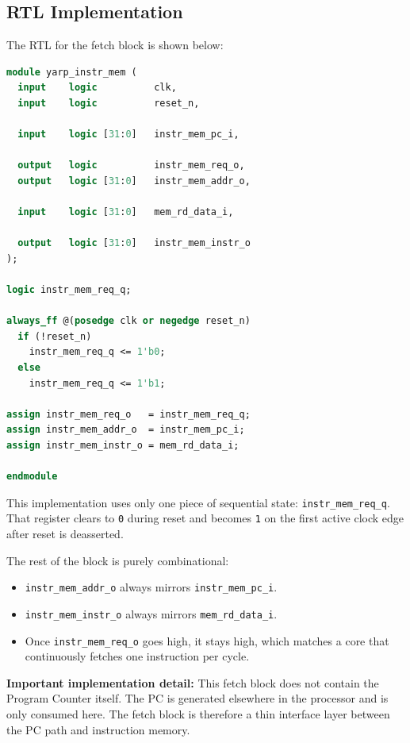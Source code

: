 \documentclass[12pt, a4paper, oneside]{book}
\begin{document}
\subsection{RTL Implementation}

The RTL for the fetch block is shown below:

\begin{lstlisting}[language=systemverilog]
module yarp_instr_mem (
  input    logic          clk,
  input    logic          reset_n,

  input    logic [31:0]   instr_mem_pc_i,

  output   logic          instr_mem_req_o,
  output   logic [31:0]   instr_mem_addr_o,

  input    logic [31:0]   mem_rd_data_i,

  output   logic [31:0]   instr_mem_instr_o
);

logic instr_mem_req_q;

always_ff @(posedge clk or negedge reset_n)
  if (!reset_n)
    instr_mem_req_q <= 1'b0;
  else
    instr_mem_req_q <= 1'b1;

assign instr_mem_req_o   = instr_mem_req_q;
assign instr_mem_addr_o  = instr_mem_pc_i;
assign instr_mem_instr_o = mem_rd_data_i;

endmodule
\end{lstlisting}

This implementation uses only one piece of sequential state: \texttt{instr\_mem\_req\_q}. That register clears to \texttt{0} during reset and becomes \texttt{1} on the first active clock edge after reset is deasserted.

The rest of the block is purely combinational:
\begin{itemize}
  \item \texttt{instr\_mem\_addr\_o} always mirrors \texttt{instr\_mem\_pc\_i}.
  \item \texttt{instr\_mem\_instr\_o} always mirrors \texttt{mem\_rd\_data\_i}.
  \item Once \texttt{instr\_mem\_req\_o} goes high, it stays high, which matches a core that continuously fetches one instruction per cycle.
\end{itemize}

\begin{warnbox}
\textbf{\color{darkred}Important implementation detail:}
This fetch block does not contain the Program Counter itself. The PC is generated elsewhere in the processor and is only consumed here. The fetch block is therefore a thin interface layer between the PC path and instruction memory.
\end{warnbox}
\end{document}
